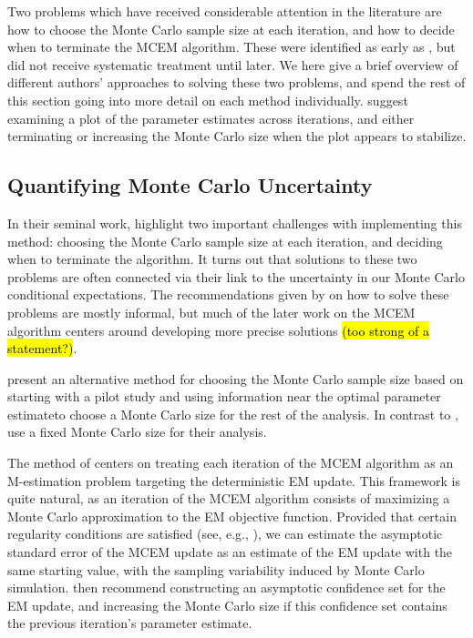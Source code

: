 \documentclass[11pt, oneside]{article}   	%
\begin{document}
Two problems which have received considerable attention in the literature are how to choose the Monte Carlo sample size at each iteration, and how to decide when to terminate the MCEM algorithm. These were identified as early as \citet{Wei90}, but did not receive systematic treatment until later. We here give a brief overview of different authors' approaches to solving these two problems, and spend the rest of this section going into more detail on each method individually. \citet{Wei90} suggest examining a plot of the parameter estimates across iterations, and either terminating or increasing the Monte Carlo size when the plot appears to stabilize.

\subsection{Quantifying Monte Carlo Uncertainty}

In their seminal work, \citet{Wei90} highlight two important challenges with implementing this method: choosing the Monte Carlo sample size at each iteration, and deciding when to terminate the algorithm. It turns out that solutions to these two problems are often connected via their link to the uncertainty in our Monte Carlo conditional expectations. The recommendations given by \citeauthor{Wei90} on how to solve these problems are mostly informal, but much of the later work on the MCEM algorithm centers around developing more precise solutions \hl{(too strong of a statement?)}.

\citet{Cha95} present an alternative method for choosing the Monte Carlo sample size based on starting with a pilot study and using information near the optimal parameter estimate\footnotemark to choose a Monte Carlo size for the rest of the analysis. In contrast to \citet{Wei90}, \citeauthor{Cha95} use a fixed Monte Carlo size for their analysis.


The method of \citet{Boo99} centers on treating each iteration of the MCEM algorithm as an M-estimation problem targeting the deterministic EM update. This framework is quite natural, as an iteration of the MCEM algorithm consists of maximizing a Monte Carlo approximation to the EM objective function. Provided that certain regularity conditions are satisfied (see, e.g., \citealp{van98}), we can estimate the asymptotic standard error of the MCEM update as an estimate of the EM update with the same starting value, with the sampling variability induced by Monte Carlo simulation. \citeauthor{Boo99} then recommend constructing an asymptotic confidence set for the EM update, and increasing the Monte Carlo size if this confidence set contains the previous iteration's parameter estimate\footnotemark.
\end{document}
